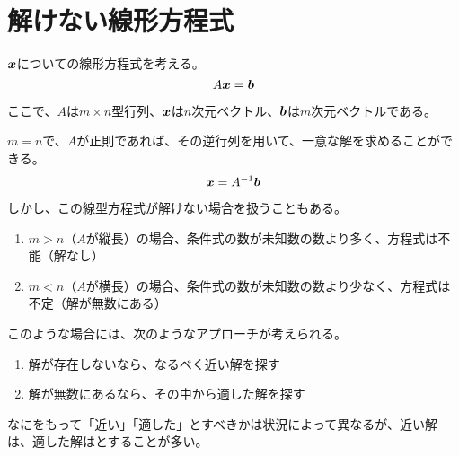 \documentclass[../../../topic_linear-algebra]{subfiles}
\begin{document}
\sectionline
\section{解けない線形方程式}

$\vb*{x}$についての線形方程式を考える。
\begin{equation*}
  A\vb*{x} = \vb*{b}
\end{equation*}

ここで、$A$は$m \times n$型行列、$\vb*{x}$は$n$次元ベクトル、$\vb*{b}$は$m$次元ベクトルである。

\br

$m =n$で、$A$が正則であれば、その逆行列を用いて、一意な解を求めることができる。
\begin{equation*}
  \vb*{x} = A^{-1}\vb*{b}
\end{equation*}

\br

しかし、この線型方程式が解けない場合を扱うこともある。
\begin{enumerate}[label=\romanlabel]
  \item $m > n$（$A$が縦長）の場合、条件式の数が未知数の数より多く、方程式は不能（解なし）
  \item $m < n$（$A$が横長）の場合、条件式の数が未知数の数より少なく、方程式は不定（解が無数にある）
\end{enumerate}

このような場合には、次のようなアプローチが考えられる。
\begin{enumerate}[label=\romanlabel]
  \item 解が存在しないなら、なるべく近い解を探す
  \item 解が無数にあるなら、その中から適した解を探す
\end{enumerate}

なにをもって「近い」「適した」とすべきかは状況によって異なるが、近い解は、適した解はとすることが多い。
\end{document}
